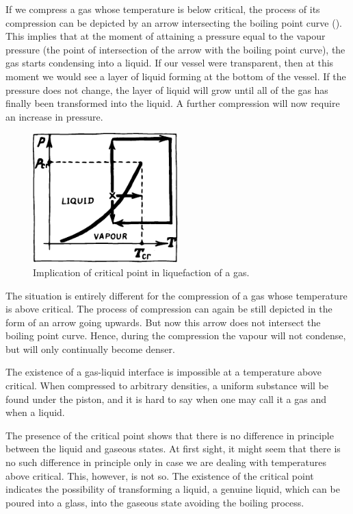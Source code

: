 If we compress a gas whose temperature is below criti­cal, the process of its compression can be depicted by an arrow intersecting the boiling point curve (). This implies that at the moment of attaining a pressure equal to the vapour pressure (the point of intersection of the arrow with the boiling point curve), the gas starts condensing into a liquid. If our vessel were transparent, then at this moment we would see a layer of liquid forming at the bottom of the vessel. If the pressure does not change, the layer of liquid will grow until all of the gas has finally been transformed into the liquid. A further compression will now require an increase in pressure.
\begin{figure}[!ht]
\centering
\includegraphics[width=0.5\textwidth]{figures/fig-04-04.pdf}
\caption{Implication of critical point in liquefaction of a gas.}
\label{fig-4.4}
\end{figure}
The situation is entirely different for the compression of a gas whose temperature is above critical. The process of compression can again be still depicted in the form of an arrow going upwards. But now this arrow does not intersect the boiling point curve. Hence, during the com­pression the vapour will not condense, but will only con­tinually become denser.

The existence of a gas-liquid interface is impossible at a temperature above critical. When compressed to arbi­trary densities, a uniform substance will be found under the piston, and it is hard to say when one may call it a gas and when a liquid.

The presence of the critical point shows that there is no difference in principle between the liquid and gaseous states. At first sight, it might seem that there is no such difference in principle only in case we are dealing with temperatures above critical. This, however, is not so. The existence of the critical point indicates the possi­bility of transforming a liquid, a genuine liquid, which can be poured into a glass, into the gaseous state avoiding the boiling process.

